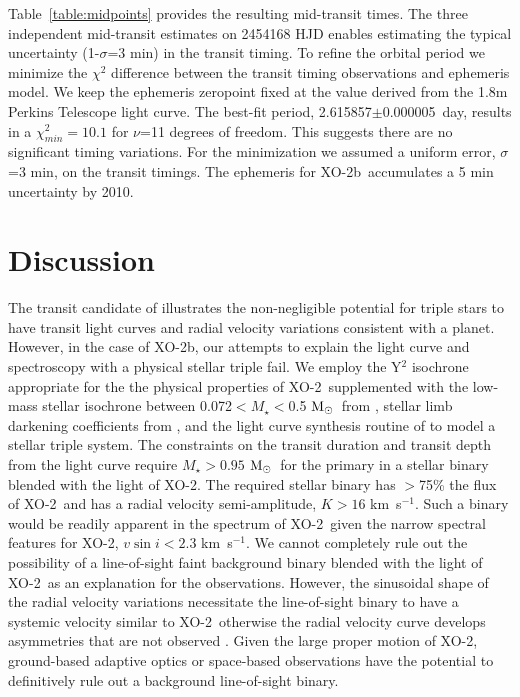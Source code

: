 \documentclass{emulateapj}
\newcommand{\kps}{km~s$^{-1}$}
\newcommand{\Msun}{${\rm M_\odot}$}
\newcommand{\xonb}{XO-2b}
\newcommand{\xon}{XO-2}
\newcommand{\vperiod}{2.615857}
\newcommand{\eperiod}{0.000005}
\begin{document}
Table~\ref{table:midpoints} provides the resulting mid-transit times.
The three independent mid-transit estimates on 2454168 HJD enables
estimating the typical uncertainty (1-$\sigma$=3 min) in the transit
timing.  To refine the orbital period we minimize the $\chi^{2}$
difference between the transit timing observations and ephemeris
model.  We keep the ephemeris zeropoint fixed at the value derived
from the 1.8m Perkins Telescope light curve.  The best-fit period,
\vperiod$\pm$\eperiod\ day, results in a $\chi^{2}_{min}=10.1$ for
$\nu$=11 degrees of freedom.  This suggests there are no significant
timing variations.  For the minimization we assumed a uniform error,
$\sigma$=3 min, on the transit timings.  The ephemeris for
\xonb\ accumulates a 5 min uncertainty by 2010.

\section{Discussion}\label{sec:disc}

The transit candidate of \citet{MAN05} illustrates the non-negligible
potential for triple stars to have transit light curves and radial
velocity variations consistent with a planet.  However, in the case of
\xonb, our attempts to explain the light curve and spectroscopy with a
physical stellar triple fail.  We employ the Y$^{2}$ isochrone
appropriate for the the physical properties of \xon\ supplemented with
the low-mass stellar isochrone between 0.072$<M_{\star}<$0.5 \Msun\
from \citet{CHAB00}, stellar limb darkening coefficients from
\citet{CLA00}, and the light curve synthesis routine of \citet{WIL93}
to model a stellar triple system.  The constraints on the transit
duration and transit depth from the light curve require
$M_{\star}>0.95$ \Msun\ for the primary in a stellar binary blended
with the light of \xon.  The required stellar binary has $>$75\% the
flux of \xon\ and has a radial velocity semi-amplitude, $K> 16$ \kps.
Such a binary would be readily apparent in the spectrum of \xon\ given
the narrow spectral features for \xon, $v\sin{i}<2.3$ \kps.  We cannot
completely rule out the possibility of a line-of-sight faint
background binary blended with the light of
\xon\ as an explanation for the observations.  However, the sinusoidal
shape of the radial velocity variations necessitate the line-of-sight
binary to have a systemic velocity similar to \xon\, otherwise the
radial velocity curve develops asymmetries that are not observed
\citep{TOR05}.  Given the large proper motion of \xon, ground-based
adaptive optics or space-based observations have the potential to
definitively rule out a background line-of-sight binary.
\end{document}
